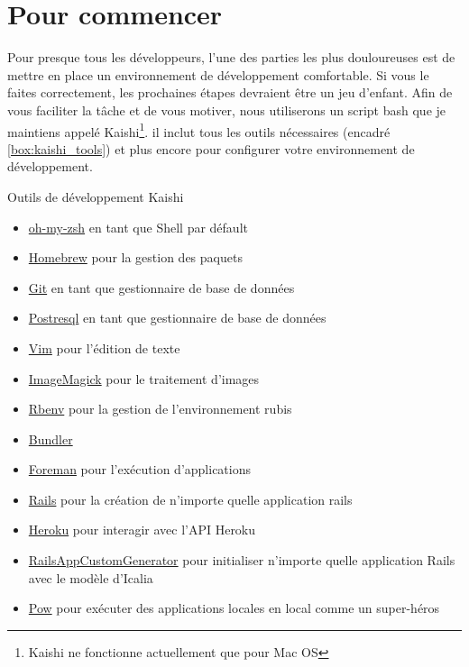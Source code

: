 \documentclass[]{report}
\begin{document}
  \section{Pour commencer}

    Pour presque tous les développeurs, l'une des parties les plus douloureuses est de mettre en place un environnement de développement comfortable. Si vous le faites correctement, les prochaines étapes devraient être un jeu d'enfant. Afin de vous faciliter la tâche et de vous motiver, nous utiliserons un script bash que je maintiens appelé Kaishi\footnote{Kaishi ne fonctionne actuellement que pour Mac OS}. il inclut tous les outils nécessaires (encadré \ref{box:kaishi_tools}) et plus encore pour configurer votre environnement de développement.

    \begin{tcolorbox}{Outils de développement Kaishi}\label{box:kaishi_tools}
      \begin{itemize}
        \item \href{https://github.com/robbyrussell/oh-my-zsh}{oh-my-zsh}  en tant que Shell par défault
        \item \href{http://brew.sh/}{Homebrew} pour la gestion des paquets
        \item \href{http://git-scm.com/}{Git} en tant que gestionnaire de base de données
        \item \href{http://www.postgresql.org/}{Postresql} en tant que gestionnaire de base de données
        \item \href{http://www.vim.org/}{Vim} pour l'édition de texte
        \item \href{http://www.imagemagick.org/}{ImageMagick} pour le traitement d'images
        \item \href{https://github.com/sstephenson/rbenv}{Rbenv} pour la gestion de l'environnement rubis
        \item \href{http://bundler.io/}{Bundler}
        \item \href{https://github.com/ddollar/foreman}{Foreman} pour l'exécution d'applications
        \item \href{http://rubyonrails.org/}{Rails} pour la création de n'importe quelle application rails
        \item \href{https://toolbelt.heroku.com/}{Heroku} pour interagir avec l'API Heroku
        \item \href{https://github.com/IcaliaLabs/railsAppCustomGenerator}{RailsAppCustomGenerator} pour initialiser n'importe quelle application Rails avec le modèle d'Icalia
        \item \href{http://pow.cx/}{Pow} pour exécuter des applications locales en local comme un super-héros
      \end{itemize}
    \end{tcolorbox}
\end{document}
